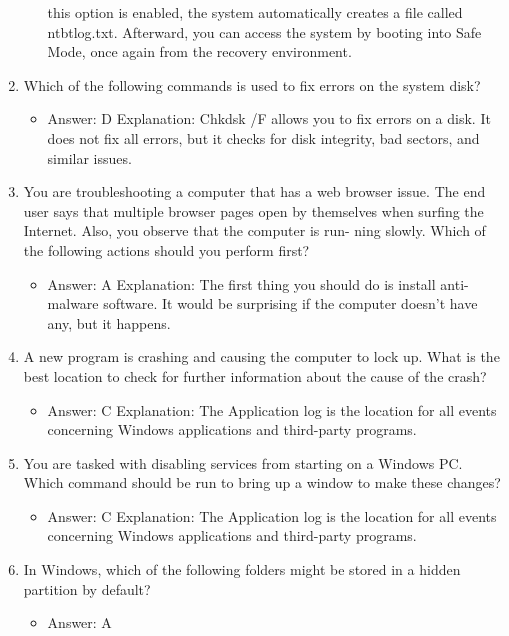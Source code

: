 \documentclass{article}
\begin{document}
\begin{enumerate}
\begin{itemize}
this option is enabled, the system automatically creates a file called ntbtlog.txt.
Afterward, you can access the system by booting into Safe Mode, once again from the
recovery environment.
    \end{itemize}
    \item Which of the following commands is used to fix errors on the
system disk?
    \begin{itemize}
        \item Answer: D
Explanation: Chkdsk /F allows you to fix errors on a disk. It does not fix all errors,
but it checks for disk integrity, bad sectors, and similar issues.
    \end{itemize}
    \item You are troubleshooting a computer that has a web browser issue.
The end user says that multiple browser pages open by themselves
when surfing the Internet. Also, you observe that the computer is run-
ning slowly. Which of the following actions should you perform first?
    \begin{itemize}
        \item Answer: A
Explanation: The first thing you should do is install anti-malware software. It would be
surprising if the computer doesn’t have any, but it happens.
    \end{itemize}
    \item A new program is crashing and causing the computer to lock up.
What is the best location to check for further information about the
cause of the crash?
    \begin{itemize}
        \item Answer: C
Explanation: The Application log is the location for all events concerning Windows
applications and third-party programs.
    \end{itemize}
    \item You are tasked with disabling services from starting on a Windows
PC. Which command should be run to bring up a window to make
these changes?
    \begin{itemize}
        \item Answer: C
Explanation: The Application log is the location for all events concerning Windows
applications and third-party programs.
    \end{itemize}
    \item In Windows, which of the following folders might be stored in a
hidden partition by default?
    \begin{itemize}
        \item Answer: A

\end{itemize}
\end{enumerate}
\end{document}
